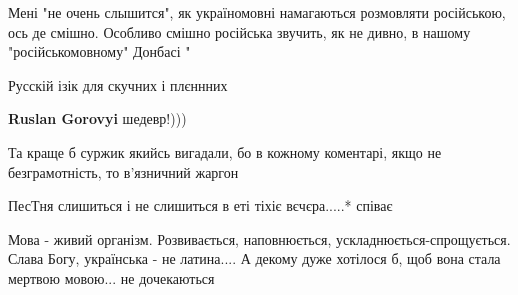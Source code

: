  

Мені "не очень слышится", як україномовні намагаються розмовляти російською,
ось де смішно. Особливо смішно російська звучить, як не дивно, в нашому
"російськомовному" Донбасі "


 

Русскій ізік для скучних і плєннних

\begin{itemize}
 
\textbf{Ruslan Gorovyi} шедевр!)))
\end{itemize}

 
Та краще б суржик якийсь вигадали, бо в кожному коментарі, якщо не безграмотність, то в'язничний жаргон

 
ПесТня слишиться і не слишиться в еті тіхіє вєчєра.....* співає

 

Мова - живий організм. Розвивається, наповнюється, ускладнюється-спрощується.
Слава Богу, українська - не латина.... А декому дуже хотілося б, щоб вона стала
мертвою мовою... не дочекаються


